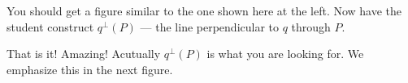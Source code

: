 \documentclass{tufte-handout}
\newcommand{\uv}{\vspace{.1in}}
\begin{document}
\begin{tcolorbox}
\uv
  
\begin{minipage}{0.65\textwidth}
\end{minipage} \hfill
\begin{minipage}{0.32\textwidth}
\begin{scriptsize}
You should get a figure similar to the one shown here at the left. Now have the student construct $q^{\perp}(P)$ --- the line perpendicular to $q$ through $P.$
\end{scriptsize} 
\end{minipage}

\uv
  
\begin{minipage}{0.65\textwidth}
\end{minipage} \hfill
\begin{minipage}{0.32\textwidth}
\begin{scriptsize}
That is it! Amazing! Acutually $q^{\perp}(P)$ is what you are looking for. We emphasize this in the next figure.
\end{scriptsize} 
\end{minipage}


\end{tcolorbox}
\end{document}
